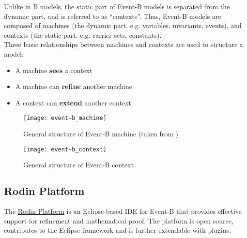 Unlike in B models, the static part of Event-B models is separated
from the dynamic part, and is referred to as ``contexts''. Thus, Event-B models
are composed of machines (the dynamic part. e.g. variables, invariants, events),
and contexts (the static part. e.g. carrier sets, constants).\\

Three basic relationships between machines and contexts are used to structure a
model:  

\begin{itemize}
  \item A machine \textbf{sees} a context
  \item A machine can \textbf{refine} another machine
  \item A context can \textbf{extend} another context
\end{itemize}

\begin{figure}[h]
  \centering
  \texttt{[image: event-b\_machine]}
  \caption{General structure of Event-B machine (taken from \cite{eventb})} 
\end{figure} 

\begin{figure}[h]
  \centering
  \texttt{[image: event-b\_context]}
  \caption{General structure of Event-B context} 
\end{figure} 


\subsection{Rodin Platform}

The
\href{http://wiki.event-b.org/index.php/Main_Page}{Rodin Platform}
is an Eclipse-based IDE for Event-B that provides effective
support for refinement and mathematical proof. The platform is open source,
contributes to the Eclipse framework and is further extendable with plugins.  

